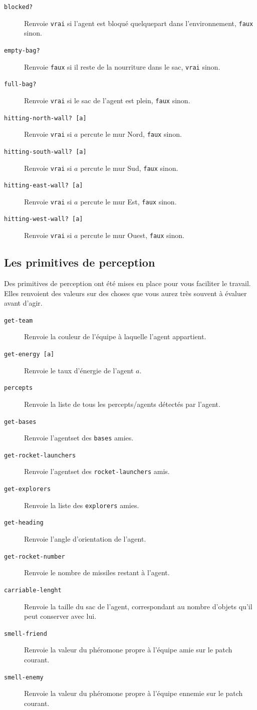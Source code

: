 \documentclass[a4paper,11pt]{article}
\begin{document}
\begin{description}
  \item[\texttt{blocked?}] Renvoie \texttt{vrai} si l'agent est bloqué quelquepart dans
    l'environnement, \texttt{faux} sinon.
  \item[\texttt{empty-bag?}] Renvoie \texttt{faux} si il reste de la nourriture dans le sac,
    \texttt{vrai} sinon.
  \item[\texttt{full-bag?}] Renvoie \texttt{vrai} si le sac de l'agent est plein, \texttt{faux}
    sinon.
  \item[\texttt{hitting-north-wall? [a]}] Renvoie \texttt{vrai} si $a$ percute le mur Nord, \texttt{faux}
    sinon.
  \item[\texttt{hitting-south-wall? [a]}] Renvoie \texttt{vrai} si $a$ percute le mur Sud, \texttt{faux}
    sinon.
  \item[\texttt{hitting-east-wall? [a]}] Renvoie \texttt{vrai} si $a$ percute le mur Est, \texttt{faux}
    sinon.
  \item[\texttt{hitting-west-wall? [a]}] Renvoie \texttt{vrai} si $a$ percute le mur Ouest, \texttt{faux}
    sinon.

\end{description}

\subsection*{Les primitives de perception}

Des primitives de perception ont été mises en place pour vous faciliter le travail. Elles renvoient
des valeurs sur des choses que vous aurez très souvent à évaluer avant d'agir.

\begin{description}
  \item[\texttt{get-team}] Renvoie la couleur de l'équipe à laquelle l'agent appartient.
  \item[\texttt{get-energy [a]}] Renvoie le taux d'énergie de l'agent $a$.
  \item[\texttt{percepts}] Renvoie la liste de tous les percepts/agents détectés par l'agent.
  \item[\texttt{get-bases}] Renvoie l'agentset des \texttt{bases} amies.
  \item[\texttt{get-rocket-launchers}] Renvoie l'agentset des \texttt{rocket-launchers} amis.
  \item[\texttt{get-explorers}] Renvoie la liste des \texttt{explorers} amies.
  \item[\texttt{get-heading}] Renvoie l'angle d'orientation de l'agent.
  \item[\texttt{get-rocket-number}] Renvoie le nombre de missiles restant à l'agent.
  \item[\texttt{carriable-lenght}] Renvoie la taille du sac de l'agent, correspondant au nombre
    d'objets qu'il peut conserver avec lui.
  \item[\texttt{smell-friend}] Renvoie la valeur du phéromone propre à l'équipe amie sur le patch
    courant.
  \item[\texttt{smell-enemy}] Renvoie la valeur du phéromone propre à l'équipe ennemie sur le patch
    courant.
\end{description}
\end{document}

